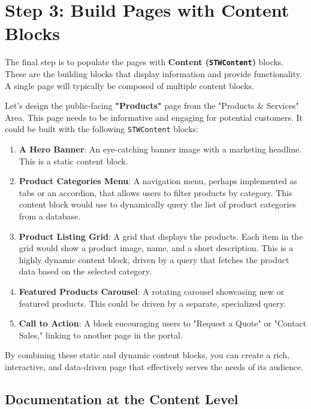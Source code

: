 \section{Step 3: Build Pages with Content Blocks}
\label{sec:build-with-content}

The final step is to populate the pages with \textbf{Content (\texttt{STWContent})} blocks. These are the building blocks that display information and provide functionality. A single page will typically be composed of multiple content blocks.

Let's design the public-facing \textbf{"Products"} page from the "Products \& Services" Area. This page needs to be informative and engaging for potential customers. It could be built with the following \texttt{STWContent} blocks:

\begin{enumerate}
    \item \textbf{A Hero Banner}: An eye-catching banner image with a marketing headline. This is a static content block.
    \item \textbf{Product Categories Menu}: A navigation menu, perhaps implemented as tabs or an accordion, that allows users to filter products by category. This content block would use \wbpl{} to dynamically query the list of product categories from a database.
    \item \textbf{Product Listing Grid}: A grid that displays the products. Each item in the grid would show a product image, name, and a short description. This is a highly dynamic content block, driven by a \wbpl{} query that fetches the product data based on the selected category.
    \item \textbf{Featured Products Carousel}: A rotating carousel showcasing new or featured products. This could be driven by a separate, specialized query.
    \item \textbf{Call to Action}: A block encouraging users to "Request a Quote" or "Contact Sales," linking to another page in the portal.
\end{enumerate}

By combining these static and dynamic content blocks, you can create a rich, interactive, and data-driven page that effectively serves the needs of its audience.

\subsection{Documentation at the Content Level}
\label{sec:content-documentation}

